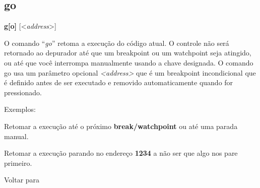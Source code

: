 \documentclass[letterpaper,10pt,brazil]{sphinxmanual}
\begin{document}
\subsection{go}
\label{debugger/execution:go}\label{debugger/execution:debugger-command-go}
\begin{DUlineblock}{0em}
\item[]
\begin{DUlineblock}{\DUlineblockindent}
\item[] \textbf{g{[}o{]}} {[}\textless{}\emph{address}\textgreater{}{]}
\item[] 
\end{DUlineblock}
\item[] O comando ``\emph{go}'' retoma a execução do código atual. O controle não será retornado ao depurador até que um breakpoint ou um watchpoint seja atingido, ou até que você interrompa manualmente usando a chave designada. O comando go usa um parâmetro opcional \emph{\textless{}address\textgreater{}} que é um breakpoint incondicional que é definido antes de ser executado e removido automaticamente quando for pressionado.
\item[] 
\item[] Exemplos:
\item[] 
\item[]
\begin{DUlineblock}{\DUlineblockindent}
\item[] 
\item[] 
\end{DUlineblock}
\item[] Retomar a execução até o próximo \textbf{break/watchpoint} ou até uma parada manual.
\item[] 
\item[]
\begin{DUlineblock}{\DUlineblockindent}
\item[] 
\item[] 
\end{DUlineblock}
\item[] Retomar a execução parando no endereço \textbf{1234} a não ser que algo nos pare primeiro.
\item[] 
\item[] Voltar para {\hyperref[debugger/execution:debugger\string-execution\string-list]{}}
\end{DUlineblock}
\begin{quote}
\label{debugger/execution:debugger-command-gvblank}\end{quote}
\end{document}
